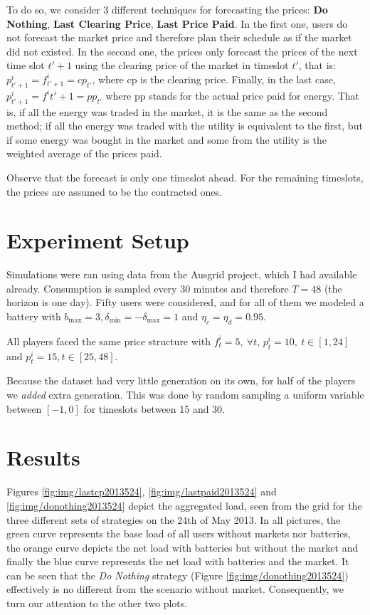 \documentclass{article}
\begin{document}
To do so, we consider 3 different techniques for forecasting the prices: \textbf{Do Nothing}, \textbf{Last Clearing Price}, \textbf{Last Price Paid}. In the first one, users do not forecast the market price and therefore plan their schedule as if the market did not existed. In the second one, the prices only forecast the prices of the next time slot $t' + 1$ using the clearing price of the market in timeslot $t'$, that is: $p^i_{t' + 1} = f^i_{t' + 1} = cp_{t'}$, where cp is the clearing price. Finally, in the last case, $p^i_{t' + 1} = f^i{t' + 1} = pp_{t'}$ where pp stands for the actual price paid for energy. That is, if all the energy was traded in the market, it is the same as the second method; if all the energy was traded with the utility is equivalent to the first, but if some energy was bought in the market and some from the utility is the weighted average of the prices paid.

Observe that the forecast is only one timeslot ahead. For the remaining timeslots, the prices are assumed to be the contracted ones. 


\section{Experiment Setup}

Simulations were ran using data from the Ausgrid project, which I had available already. Consumption is sampled every 30 minutes and therefore $T = 48$ (the horizon is one day).
Fifty users were considered, and for all of them we modeled a battery with $b_{\max} = 3, \delta_{\min} = -\delta_{\max} = 1$ and $\eta_c = \eta_d = 0.95$.

All players faced the same price structure with $f^i_t = 5, \ \forall t$, $p^i_t = 10, \ t \in [1, 24]$ and $p^i_t = 15, t \in [25, 48]$.

Because the dataset had very little generation on its own, for half of the players we \textit{added} extra generation. This was done by random sampling a uniform variable between $[-1, 0]$ for timeslots between 15 and 30.

\section{Results}

Figures \ref{fig:img/lastcp2013524}, \ref{fig:img/lastpaid2013524} and \ref{fig:img/donothing2013524} depict the aggregated load, seen from the grid for the three different sets of strategies on the 24th of May 2013. In all pictures, the green curve represents the base load of all users without markets nor batteries, the orange curve depicts the net load with batteries but without the market and finally the blue curve represents the net load with batteries and the market. 
It can be seen that the \textit{Do Nothing} strategy (Figure \ref{fig:img/donothing2013524}) effectively is no different from the scenario without market. Consequently, we turn our attention to the other two plots. 
\end{document}
